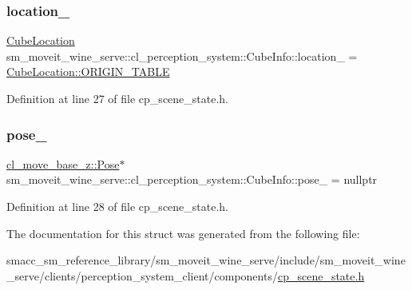 \subsubsection{\texorpdfstring{location\+\_\+}{location\_}}
{\footnotesize\ttfamily \hyperlink{namespacesm__moveit__wine__serve_1_1cl__perception__system_abb5953d380907809caaf4c1a83eec32c}{Cube\+Location} sm\+\_\+moveit\+\_\+wine\+\_\+serve\+::cl\+\_\+perception\+\_\+system\+::\+Cube\+Info\+::location\+\_\+ = \hyperlink{namespacesm__moveit__wine__serve_1_1cl__perception__system_abb5953d380907809caaf4c1a83eec32cae5ee34c3ef8ec4a46a00a218416c7b1d}{Cube\+Location\+::\+O\+R\+I\+G\+I\+N\+\_\+\+T\+A\+B\+LE}}



Definition at line 27 of file cp\+\_\+scene\+\_\+state.\+h.

\mbox{\label{structsm__moveit__wine__serve_1_1cl__perception__system_1_1CubeInfo_a90fad7432d2ac34b9343178e5db9a586}} 
\subsubsection{\texorpdfstring{pose\+\_\+}{pose\_}}
{\footnotesize\ttfamily \hyperlink{classcl__move__base__z_1_1Pose}{cl\+\_\+move\+\_\+base\+\_\+z\+::\+Pose}$\ast$ sm\+\_\+moveit\+\_\+wine\+\_\+serve\+::cl\+\_\+perception\+\_\+system\+::\+Cube\+Info\+::pose\+\_\+ = nullptr}



Definition at line 28 of file cp\+\_\+scene\+\_\+state.\+h.



The documentation for this struct was generated from the following file\+:\begin{DoxyCompactItemize}
\item 
smacc\+\_\+sm\+\_\+reference\+\_\+library/sm\+\_\+moveit\+\_\+wine\+\_\+serve/include/sm\+\_\+moveit\+\_\+wine\+\_\+serve/clients/perception\+\_\+system\+\_\+client/components/\hyperlink{sm__moveit__wine__serve_2include_2sm__moveit__wine__serve_2clients_2perception__system__client_2components_2cp__scene__state_8h}{cp\+\_\+scene\+\_\+state.\+h}\end{DoxyCompactItemize}
